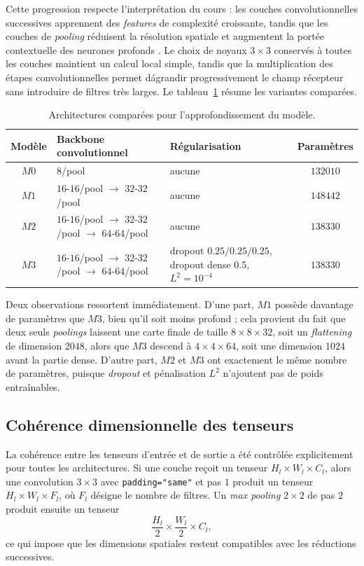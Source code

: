 Cette progression respecte l'interpr\'etation du cours : les couches convolutionnelles successives apprennent des \textit{features} de complexit\'e croissante, tandis que les couches de \textit{pooling} r\'eduisent la r\'esolution spatiale et augmentent la port\'ee contextuelle des neurones profonds \cite{poly_chap4_classifml}. Le choix de noyaux $3\times 3$ conserv\'es \`a toutes les couches maintient un calcul local simple, tandis que la multiplication des \'etapes convolutionnelles permet d\'agrandir progressivement le champ r\'ecepteur sans introduire de filtres tr\`es larges. Le tableau~\ref{tab:section6_architectures} r\'esume les variantes compar\'ees.

\begin{table}[htbp]
\centering
\caption{Architectures compar\'ees pour l'approfondissement du mod\`ele.}
\label{tab:section6_architectures}
\small
\begin{tabular}{|c|l|l|c|}
\hline
Mod\`ele & Backbone convolutionnel & R\'egularisation & Param\`etres \\
\hline
$M0$ & $8$/pool & aucune & $132010$ \\
$M1$ & $16$-$16$/pool $\rightarrow$ $32$-$32$/pool & aucune & $148442$ \\
$M2$ & $16$-$16$/pool $\rightarrow$ $32$-$32$/pool $\rightarrow$ $64$-$64$/pool & aucune & $138330$ \\
$M3$ & $16$-$16$/pool $\rightarrow$ $32$-$32$/pool $\rightarrow$ $64$-$64$/pool & dropout $0.25/0.25/0.25$, dropout dense $0.5$, $L^2=10^{-4}$ & $138330$ \\
\hline
\end{tabular}
\end{table}

Deux observations ressortent imm\'ediatement. D'une part, $M1$ poss\`ede davantage de param\`etres que $M3$, bien qu'il soit moins profond ; cela provient du fait que deux seuls \textit{poolings} laissent une carte finale de taille $8\times 8\times 32$, soit un \textit{flattening} de dimension $2048$, alors que $M3$ descend \`a $4\times 4\times 64$, soit une dimension $1024$ avant la partie dense. D'autre part, $M2$ et $M3$ ont exactement le m\^eme nombre de param\`etres, puisque \textit{dropout} et p\'enalisation $L^2$ n'ajoutent pas de poids entra\^inables.

\subsection{Coh\'erence dimensionnelle des tenseurs}
La coh\'erence entre les tenseurs d'entr\'ee et de sortie a \'et\'e contr\^ol\'ee explicitement pour toutes les architectures. Si une couche re\c coit un tenseur $H_l \times W_l \times C_l$, alors une convolution $3\times 3$ avec \texttt{padding="same"} et pas $1$ produit un tenseur $H_l \times W_l \times F_l$, o\`u $F_l$ d\'esigne le nombre de filtres. Un \textit{max pooling} $2\times 2$ de pas $2$ produit ensuite un tenseur
\begin{equation}
\frac{H_l}{2} \times \frac{W_l}{2} \times C_l,
\end{equation}
ce qui impose que les dimensions spatiales restent compatibles avec les r\'eductions successives.

